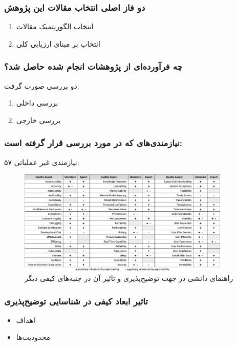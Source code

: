 \documentclass[10pt, a4paper]{beamer}
\begin{document}
\begin{frame}
    \frametitle{دو فاز اصلی انتخاب مقالات این پژوهش}

    \begin{enumerate}
        \item انتخاب الگوریتمیک مقالات
        \item انتخاب بر مبنای ارزیابی کلی
    \end{enumerate}
\end{frame}

\begin{frame}
    \frametitle{چه فرآورده‌ای از پژوهشات انجام شده حاصل شد؟}
    دو بررسی صورت گرفت:

    \begin{enumerate}
        \item بررسی داخلی
        \item بررسی خارجی
    \end{enumerate}
\end{frame}

\begin{frame}
    \frametitle{نیازمندی‌های  که در  مورد بررسی قرار گرفته است:}
    ۵۷ نیازمندی غیر عملیاتی:

    \begin{figure}[H]
        \centering
    \includegraphics[width=0.9\textwidth]{images/knowledge_catalogue.png}
        \caption{راهنمای دانشی در جهت توضیح‌پذیری و تاثیر آن در جنبه‌های کیفی
        دیگر}
        \label{fig:slrOrder}
    \end{figure}
\end{frame}

\begin{frame}
    \frametitle{تاثیر ابعاد کیفی در شناسایی توضیح‌پذیری}

    \begin{itemize}
        \item اهداف
        \item محدودیت‌ها
    \end{itemize}
\end{frame}
\end{document}
